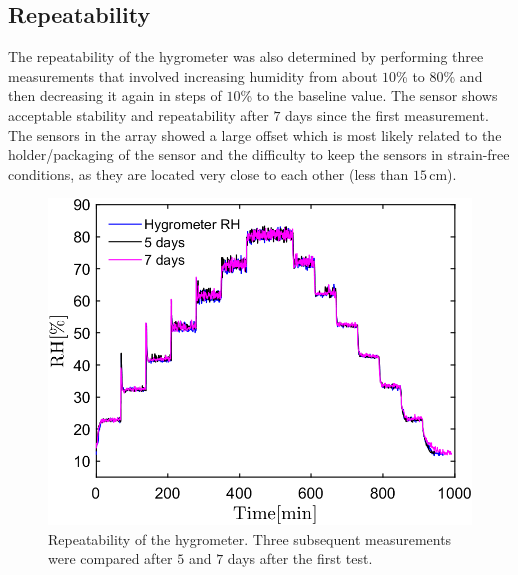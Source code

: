 \subsection{Repeatability}
The repeatability of the hygrometer was also determined by performing three measurements that involved increasing humidity from about $10$\% to $80$\% and then decreasing it again in steps of $10$\% to the baseline value. The sensor shows acceptable stability and repeatability after $7$ days since the first measurement. The sensors in the array showed a large offset which is most likely related to the holder/packaging of the sensor and the difficulty to keep the sensors in strain-free conditions, as they are located very close to each other (less than $15$\,cm).
\begin{figure}[!h]
\centering
\includegraphics[width=0.6\columnwidth]{Chapter5/images/repeat.png}
\caption{Repeatability of the hygrometer. Three subsequent measurements were compared after $5$ and $7$ days after the first test.}
\label{fig_repeatability}
\end{figure}





